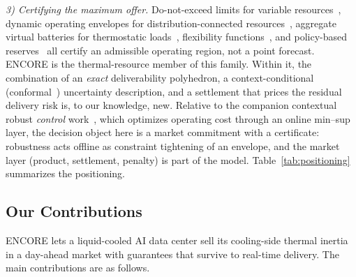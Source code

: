 \textit{3) Certifying the maximum offer.} Do-not-exceed limits for variable
resources~\cite{zhao2015variable}, dynamic operating envelopes for
distribution-connected resources~\cite{aemo2022doe}, aggregate virtual
batteries for thermostatic loads~\cite{hao2015aggregate}, flexibility
functions~\cite{junker2018characterizing}, and policy-based
reserves~\cite{warrington2013policy} all certify an admissible operating
region, not a point forecast. ENCORE is the thermal-resource member of
this family. Within it, the combination of an \emph{exact} deliverability
polyhedron, a context-conditional (conformal~\cite{lei2018distribution})
uncertainty description, and a settlement that prices the residual delivery
risk is, to our knowledge, new. Relative to the companion contextual robust
\emph{control} work~\cite{shen2026cdro}, which optimizes operating cost
through an online min--sup layer, the decision object here is a market
commitment with a certificate: robustness acts offline as constraint
tightening of an envelope, and the market layer (product, settlement,
penalty) is part of the model. Table~\ref{tab:positioning} summarizes the
positioning.

\vspace{-3mm}
\subsection{Our Contributions}
\label{subsec:contributions}

ENCORE lets a liquid-cooled AI data center sell its cooling-side thermal
inertia in a day-ahead market with guarantees that survive to real-time
delivery. The main contributions are as follows.

